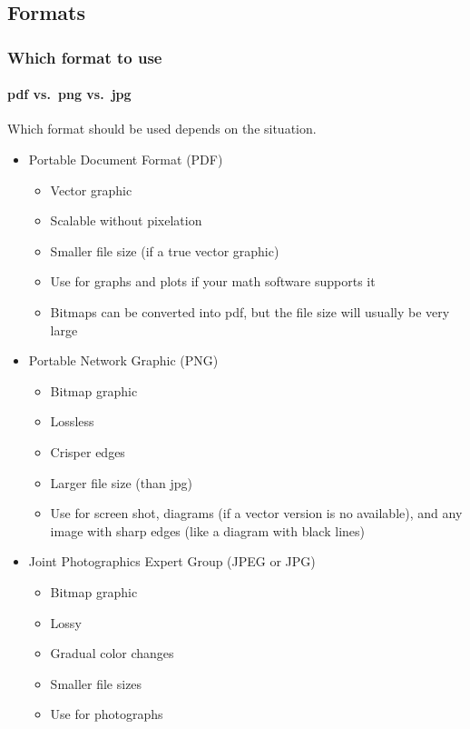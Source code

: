 \documentclass[article]{beamer}
\begin{document}
\subsection{Formats}
\begin{frame}[shrink]
  \frametitle{Which format to use}
  \framesubtitle{pdf vs.\ png vs.\ jpg}
  Which format should be used depends on the situation.
    \begin{itemize}%
      \item Portable Document Format (PDF)
        \begin{itemize}%
          \item Vector graphic
          \item Scalable without pixelation
          \item Smaller file size (if a true vector graphic)
          \item Use for graphs and plots if your math software supports it
          \item Bitmaps can be converted into pdf, but the file size will usually be very large
        \end{itemize}
      \item Portable Network Graphic (PNG)
        \begin{itemize}%
          \item Bitmap graphic
          \item Lossless
          \item Crisper edges
          \item Larger file size (than jpg)
          \item Use for screen shot, diagrams (if a vector version is no available), and any image with sharp edges (like a diagram with black lines)
        \end{itemize}
      \item Joint Photographics Expert Group (JPEG or JPG)
        \begin{itemize}%
          \item Bitmap graphic
          \item Lossy
          \item Gradual color changes
          \item Smaller file sizes
          \item Use for photographs
        \end{itemize}
    \end{itemize}
\end{frame}
\end{document}
